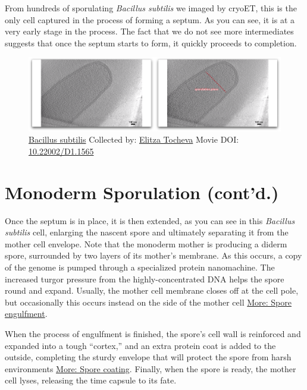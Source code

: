 \documentclass[]{tufte-book}
\begin{document}
From hundreds of sporulating \emph{Bacillus subtilis} we imaged by
cryoET, this is the only cell captured in the process of forming a
septum. As you can see, it is at a very early stage in the process. The
fact that we do not see more intermediates suggests that once the septum
starts to form, it quickly proceeds to completion.





\begin{figure}
\includegraphics{movie_stills/8_5a} \caption[\protect\hyperlink{tree}{Bacillus subtilis} Collected by:
\protect\hyperlink{elitza_tocheva}{Elitza Tocheva} Movie DOI:
\href{https://doi.org/10.22002/D1.1565}{10.22002/D1.1565}]{\protect\hyperlink{tree}{Bacillus subtilis} Collected by:
\protect\hyperlink{elitza_tocheva}{Elitza Tocheva} Movie DOI:
\href{https://doi.org/10.22002/D1.1565}{10.22002/D1.1565}}\label{fig:8-5a}
\end{figure}

\section{Monoderm Sporulation
(cont'd.)}\label{monoderm-sporulation-contd.}

Once the septum is in place, it is then extended, as you can see in this
\emph{Bacillus subtilis} cell, enlarging the nascent spore and
ultimately separating it from the mother cell envelope. Note that the
monoderm mother is producing a diderm spore, surrounded by two layers of
its mother's membrane. As this occurs, a copy of the genome is pumped
through a specialized protein nanomachine. The increased turgor pressure
from the highly-concentrated DNA helps the spore round and expand.
Usually, the mother cell membrane closes off at the cell pole, but
occasionally this occurs instead on the side of the mother cell
\protect\hyperlink{Spore_engulfment}{More: Spore engulfment}.

When the process of engulfment is finished, the spore's cell wall is
reinforced and expanded into a tough ``cortex,'' and an extra protein
coat is added to the outside, completing the sturdy envelope that will
protect the spore from harsh environments
\protect\hyperlink{Spore_coating}{More: Spore coating}. Finally, when
the spore is ready, the mother cell lyses, releasing the time capsule to
its fate.
\end{document}
